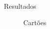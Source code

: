 \documentclass[serif,mathserif,final]{beamer}
\begin{document}
\begin{frame}{}
\begin{columns}[t]
\begin{column}{0.32\linewidth}
\begin{block}{Resultados}
				\begin{figure}[htb]
         \centering
				\caption{Cartões}
        \end{figure}
      \end{block}

    \end{column}%

  \end{columns}
\end{frame}
\end{document}

